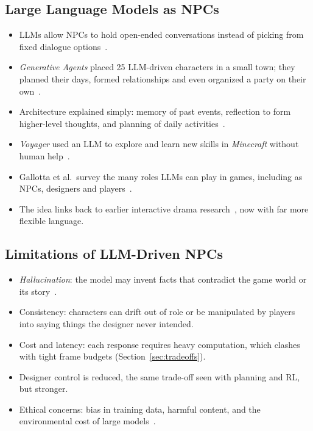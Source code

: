\subsection{Large Language Models as NPCs}
\begin{itemize}
  \item LLMs allow NPCs to hold open-ended conversations instead of picking
        from fixed dialogue options~\cite{gallotta2024}.
  \item \emph{Generative Agents} placed 25 LLM-driven characters in a small
        town; they planned their days, formed relationships and even
        organized a party on their own~\cite{park2023}.
  \item Architecture explained simply: memory of past events, reflection
        to form higher-level thoughts, and planning of daily
        activities~\cite{park2023}.
  \item \emph{Voyager} used an LLM to explore and learn new skills in
        \emph{Minecraft} without human help~\cite{wang2023}.
  \item Gallotta et al.\ survey the many roles LLMs can play in games,
        including as NPCs, designers and players~\cite{gallotta2024}.
  \item The idea links back to earlier interactive drama
        research~\cite{mateas2005,evans2014}, now with far more flexible
        language.
\end{itemize}

\subsection{Limitations of LLM-Driven NPCs}
\begin{itemize}
  \item \emph{Hallucination}: the model may invent facts that contradict
        the game world or its story~\cite{ji2023}.
  \item Consistency: characters can drift out of role or be manipulated by
        players into saying things the designer never intended.
  \item Cost and latency: each response requires heavy computation, which
        clashes with tight frame budgets (Section~\ref{sec:tradeoffs}).
  \item Designer control is reduced, the same trade-off seen with planning
        and RL, but stronger.
  \item Ethical concerns: bias in training data, harmful content, and the
        environmental cost of large models~\cite{bender2021}.
\end{itemize}

